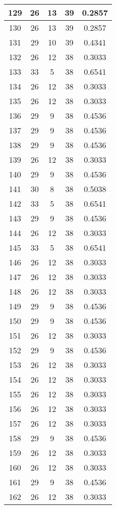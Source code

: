 \documentclass[letterpaper, 12pt]{article}
\begin{document}
\begin{longtable}{|c|c|c|c|c|}
\hline
129 & 26 & 13 & 39 & 0.2857 \\
\hline
130 & 26 & 13 & 39 & 0.2857 \\
\hline
131 & 29 & 10 & 39 & 0.4341 \\
\hline
132 & 26 & 12 & 38 & 0.3033 \\
\hline
133 & 33 & 5 & 38 & 0.6541 \\
\hline
134 & 26 & 12 & 38 & 0.3033 \\
\hline
135 & 26 & 12 & 38 & 0.3033 \\
\hline
136 & 29 & 9 & 38 & 0.4536 \\
\hline
137 & 29 & 9 & 38 & 0.4536 \\
\hline
138 & 29 & 9 & 38 & 0.4536 \\
\hline
139 & 26 & 12 & 38 & 0.3033 \\
\hline
140 & 29 & 9 & 38 & 0.4536 \\
\hline
141 & 30 & 8 & 38 & 0.5038 \\
\hline
142 & 33 & 5 & 38 & 0.6541 \\
\hline
143 & 29 & 9 & 38 & 0.4536 \\
\hline
144 & 26 & 12 & 38 & 0.3033 \\
\hline
145 & 33 & 5 & 38 & 0.6541 \\
\hline
146 & 26 & 12 & 38 & 0.3033 \\
\hline
147 & 26 & 12 & 38 & 0.3033 \\
\hline
148 & 26 & 12 & 38 & 0.3033 \\
\hline
149 & 29 & 9 & 38 & 0.4536 \\
\hline
150 & 29 & 9 & 38 & 0.4536 \\
\hline
151 & 26 & 12 & 38 & 0.3033 \\
\hline
152 & 29 & 9 & 38 & 0.4536 \\
\hline
153 & 26 & 12 & 38 & 0.3033 \\
\hline
154 & 26 & 12 & 38 & 0.3033 \\
\hline
155 & 26 & 12 & 38 & 0.3033 \\
\hline
156 & 26 & 12 & 38 & 0.3033 \\
\hline
157 & 26 & 12 & 38 & 0.3033 \\
\hline
158 & 29 & 9 & 38 & 0.4536 \\
\hline
159 & 26 & 12 & 38 & 0.3033 \\
\hline
160 & 26 & 12 & 38 & 0.3033 \\
\hline
161 & 29 & 9 & 38 & 0.4536 \\
\hline
162 & 26 & 12 & 38 & 0.3033 \\

\end{longtable}
\end{document}
